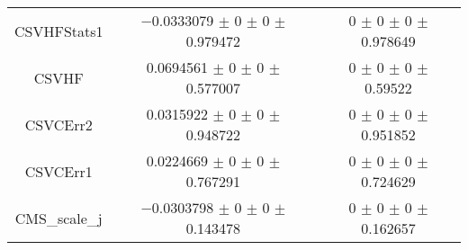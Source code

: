 \begin{table}
\begin{tabular}{ccc}
CSVHFStats1 & \num{-0.0333079} $\pm$ \num{0} $\pm$ \num{0} $\pm$ \num{0.979472} & \num{0} $\pm$ \num{0} $\pm$ \num{0} $\pm$ \num{0.978649}\\
CSVHF & \num{0.0694561} $\pm$ \num{0} $\pm$ \num{0} $\pm$ \num{0.577007} & \num{0} $\pm$ \num{0} $\pm$ \num{0} $\pm$ \num{0.59522}\\
CSVCErr2 & \num{0.0315922} $\pm$ \num{0} $\pm$ \num{0} $\pm$ \num{0.948722} & \num{0} $\pm$ \num{0} $\pm$ \num{0} $\pm$ \num{0.951852}\\
CSVCErr1 & \num{0.0224669} $\pm$ \num{0} $\pm$ \num{0} $\pm$ \num{0.767291} & \num{0} $\pm$ \num{0} $\pm$ \num{0} $\pm$ \num{0.724629}\\
CMS\_scale\_j & \num{-0.0303798} $\pm$ \num{0} $\pm$ \num{0} $\pm$ \num{0.143478} & \num{0} $\pm$ \num{0} $\pm$ \num{0} $\pm$ \num{0.162657}\\
\bottomrule
\end{tabular}
\end{table}